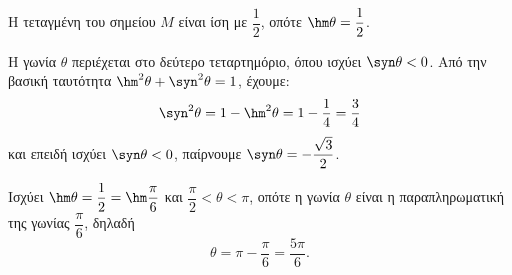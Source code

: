 \begin{alist}
\item Η τεταγμένη του σημείου $M$ είναι ίση με $\dfrac{1}{2}$, οπότε $\hm \theta = \dfrac{1}{2}$.
\item Η γωνία $\theta$ περιέχεται στο δεύτερο τεταρτημόριο, όπου ισχύει $\syn \theta < 0$. Από την βασική ταυτότητα $\hm ^2\theta + \syn ^2\theta = 1$, έχουμε:
\[\syn ^2\theta = 1 - \hm ^2\theta = 1 - \dfrac{1}{4} = \dfrac{3}{4}\]
και επειδή ισχύει $\syn \theta < 0$, παίρνουμε $\syn \theta = -\dfrac{\sqrt{3}}{2}$.
\item Ισχύει $\hm \theta = \dfrac{1}{2} = \hm \dfrac{\pi}{6}$ και $\dfrac{\pi}{2} < \theta < \pi$, οπότε η γωνία $\theta$ είναι η παραπληρωματική της γωνίας $\dfrac{\pi}{6}$, δηλαδή
\[\theta = \pi - \dfrac{\pi}{6} = \dfrac{5\pi}{6}.\]
\end{alist}

